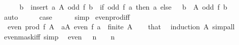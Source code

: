 \begin{isabellebody}
\ \ \isamarkupfalse%
\ \isamarkupfalse%
\ {\isacartoucheopen}{\isacharbraceleft}{\kern0pt}b\ {\isasymin}\ insert\ a\ A{\isachardot}{\kern0pt}\ odd\ {\isacharparenleft}{\kern0pt}f\ b{\isacharparenright}{\kern0pt}{\isacharbraceright}{\kern0pt}\ {\isacharequal}{\kern0pt}\ {\isacharparenleft}{\kern0pt}if\ odd\ {\isacharparenleft}{\kern0pt}f\ a{\isacharparenright}{\kern0pt}\ then\ {\isacharbraceleft}{\kern0pt}a{\isacharbraceright}{\kern0pt}\ else\ {\isacharbraceleft}{\kern0pt}{\isacharbraceright}{\kern0pt}{\isacharparenright}{\kern0pt}\ {\isasymunion}\ {\isacharbraceleft}{\kern0pt}b\ {\isasymin}\ A{\isachardot}{\kern0pt}\ odd\ {\isacharparenleft}{\kern0pt}f\ b{\isacharparenright}{\kern0pt}{\isacharbraceright}{\kern0pt}{\isacartoucheclose}\isanewline
\ \ \ \ \isamarkupfalse%
\ auto\isanewline
\ \ \isamarkupfalse%
\ \isamarkupfalse%
\ {\isacharquery}{\kern0pt}case\isanewline
\ \ \ \ \isamarkupfalse%
\ simp\isanewline
{}\isamarkupfalse%
%
\endisatagproof
{\isafoldproof}%
%
\isadelimproof
\isanewline
%
\endisadelimproof
\isanewline
{}\isamarkupfalse%
\ even{\isacharunderscore}{\kern0pt}prod{\isacharunderscore}{\kern0pt}iff{\isacharcolon}{\kern0pt}\isanewline
\ \ {\isacartoucheopen}even\ {\isacharparenleft}{\kern0pt}prod\ f\ A{\isacharparenright}{\kern0pt}\ {\isasymlongleftrightarrow}\ {\isacharparenleft}{\kern0pt}{\isasymexists}a{\isasymin}A{\isachardot}{\kern0pt}\ even\ {\isacharparenleft}{\kern0pt}f\ a{\isacharparenright}{\kern0pt}{\isacharparenright}{\kern0pt}{\isacartoucheclose}\ \ {\isacartoucheopen}finite\ A{\isacartoucheclose}\isanewline
%
\isadelimproof
\ \ %
\endisadelimproof
%
\isatagproof
{}\isamarkupfalse%
\ that\ \isamarkupfalse%
\ {\isacharparenleft}{\kern0pt}induction\ A{\isacharparenright}{\kern0pt}\ simp{\isacharunderscore}{\kern0pt}all%
\endisatagproof
{\isafoldproof}%
%
\isadelimproof
\isanewline
%
\endisadelimproof
\isanewline
{}\isamarkupfalse%
\ even{\isacharunderscore}{\kern0pt}mask{\isacharunderscore}{\kern0pt}iff\ {\isacharbrackleft}{\kern0pt}simp{\isacharbrackright}{\kern0pt}{\isacharcolon}{\kern0pt}\isanewline
\ \ {\isacartoucheopen}even\ {\isacharparenleft}{\kern0pt}{}\ {\isacharcircum}{\kern0pt}\ n\ {\isacharminus}{\kern0pt}\ {}{\isacharparenright}{\kern0pt}\ {\isasymlongleftrightarrow}\ n\ {\isacharequal}{\kern0pt}\ {}{\isacartoucheclose}\isanewline
%
\isadelimproof
%
\endisadelimproof
%
\isatagproof
{}\isamarkupfalse%

\end{isabellebody}
